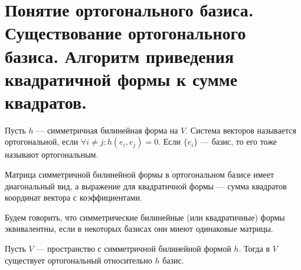 \section{Понятие ортогонального базиса. Существование ортогонального базиса. Алгоритм приведения квадратичной формы к сумме квадратов.}
\begin{defn}
    Пусть $ h$ --- симметричная билинейная форма на  $ V$.  
    Система векторов называется {\sf ортогональной}, если $ \forall i \ne j\colon h(e_i, e_j) = 0$. Если $ \{e_i\}$ --- базис, то его тоже  называют {\sf ортогональным}.  
    \begin{note}
        Матрица симметричной билинейной формы в ортогональном базисе имеет диагональный вид, а выражение для квадратичной формы --- сумма квадратов координат вектора с коэффициентами.
    \end{note}
\end{defn}
\begin{defn}[Эквивалентность]
    Будем говорить, что симметрические билинейные (или квадратичные) формы {\sf эквивалентны}, если в некоторых базисах они миеют одинаковые матрицы.
\end{defn}
\begin{thm}
    Пусть $ V$ --- пространство с симметричной билинейной формой  $ h$. Тогда в  $ V$ существует ортогональный относительно  $h $ базис.
\end{thm}


